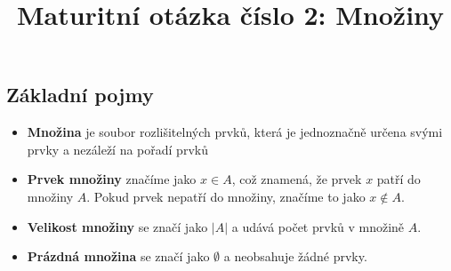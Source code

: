 \documentclass[12pt]{article}
\title{Maturitní otázka číslo 2: Množiny}
\author{}
\date{}
\begin{document}
\maketitle
\subsection*{Základní pojmy}
\begin{itemize}[itemsep = 2pt]
    \item \textbf{Množina} je soubor rozlišitelných prvků, která je jednoznačně určena svými prvky a nezáleží na pořadí prvků
    \item \textbf{Prvek množiny} značíme jako $x \in A$, což znamená, že prvek $x$ patří do množiny $A$. Pokud prvek nepatří do množiny, značíme to jako $x \notin A$.
    \item \textbf{Velikost množiny} se značí jako $|A|$ a udává počet prvků v množině $A$.
    \item \textbf{Prázdná množina} se značí jako $\emptyset$ a neobsahuje žádné prvky.

\end{itemize}
\
\end{document}
